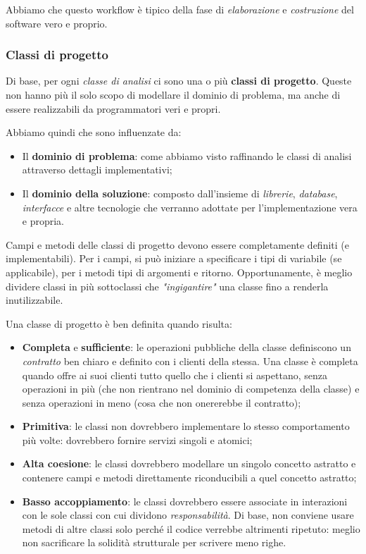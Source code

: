 \documentclass[a4paper,11pt]{article}
\begin{document}
Abbiamo che questo workflow è tipico della fase di \textit{elaborazione} e \textit{costruzione} del software vero e proprio.

\subsubsection{Classi di progetto}
Di base, per ogni \textit{classe di analisi} ci sono una o più \textbf{classi di progetto}.
Queste non hanno più il solo scopo di modellare il dominio di problema, ma anche di essere realizzabili da programmatori veri e propri. 

Abbiamo quindi che sono influenzate da:
\begin{itemize}
	\item Il \textbf{dominio di problema}: come abbiamo visto raffinando le classi di analisi attraverso dettagli implementativi;
	\item Il \textbf{dominio della soluzione}: composto dall'insieme di \textit{librerie}, \textit{database}, \textit{interfacce} e altre tecnologie che verranno adottate per l'implementazione vera e propria.
\end{itemize}

Campi e metodi delle classi di progetto devono essere completamente definiti (e implementabili). Per i campi, si può iniziare a specificare i tipi di variabile (se applicabile), per i metodi tipi di argomenti e ritorno.
Opportunamente, è meglio dividere classi in più sottoclassi che \textit{"ingigantire"} una classe fino a renderla inutilizzabile.

Una classe di progetto è ben definita quando risulta:
\begin{itemize}
	\item \textbf{Completa} e \textbf{sufficiente}: le operazioni pubbliche della classe definiscono un \textit{contratto} ben chiaro e definito con i clienti della stessa.
		Una classe è completa quando offre ai suoi clienti tutto quello che i clienti si aspettano, senza operazioni in più (che non rientrano nel dominio di competenza della classe) e senza operazioni in meno (cosa che non onererebbe il contratto);
	\item \textbf{Primitiva}: le classi non dovrebbero implementare lo stesso comportamento più volte: dovrebbero fornire servizi singoli e atomici;
	\item \textbf{Alta coesione}: le classi dovrebbero modellare un singolo concetto astratto e contenere campi e metodi direttamente riconducibili a quel concetto astratto;
	\item \textbf{Basso accoppiamento}: le classi dovrebbero essere associate in interazioni con le sole classi con cui dividono \textit{responsabilità}. Di base, non conviene usare metodi di altre classi solo perché il codice verrebbe altrimenti ripetuto: meglio non sacrificare la solidità strutturale per scrivere meno righe.
\end{itemize}
\end{document}
